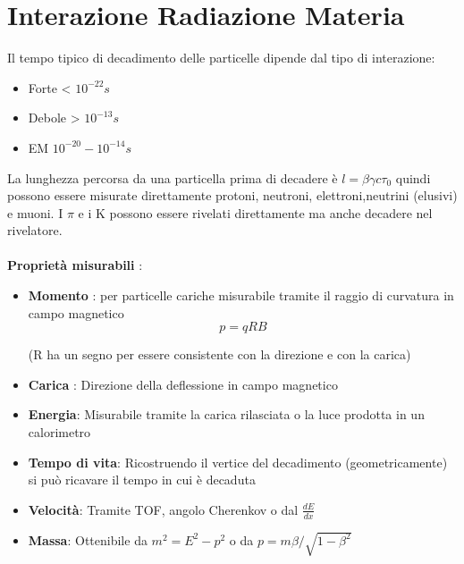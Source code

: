 \chapter{Interazione Radiazione Materia}
Il tempo tipico di decadimento delle particelle dipende dal tipo di interazione:
\begin{itemize}
    \item Forte  < $10^{-22}s$
    \item Debole > $10^{-13}s$
    \item EM $10^{-20}-10^{-14}s$
\end{itemize}
La lunghezza percorsa da una particella prima di decadere è $l=\beta \gamma c \tau_0$ quindi possono essere misurate direttamente protoni, neutroni, elettroni,neutrini (elusivi) e muoni. I $\pi$ e i K possono essere rivelati direttamente ma anche decadere nel rivelatore.
\\
\\
\textbf{Proprietà misurabili} :
\begin{itemize}
    \item \textbf{Momento} : per particelle cariche misurabile tramite il raggio di curvatura in campo magnetico $$p=qRB$$ \begin{center}
        (R ha un segno per essere consistente con la direzione e con la carica)
    \end{center}
    \item \textbf{Carica} : Direzione della deflessione in campo magnetico
    \item \textbf{Energia}: Misurabile tramite la carica rilasciata o la luce prodotta in un calorimetro
    \item \textbf{Tempo di vita}: Ricostruendo il vertice del decadimento (geometricamente) si può ricavare il tempo in cui è decaduta
    \item \textbf{Velocità}: Tramite TOF, angolo Cherenkov o dal $\frac{dE}{dx}$
    \item \textbf{Massa}: Ottenibile da $m^2=E^2-p^2$ o da $p=m\beta/\sqrt{1-\beta^2} $
\end{itemize}

